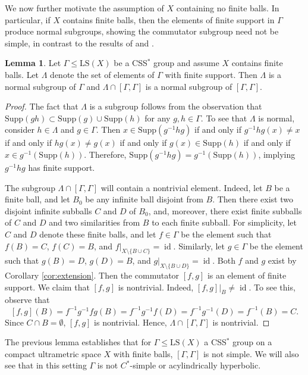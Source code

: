 \documentclass[12pt]{amsart}
\numberwithin{equation}{subsection}
\theoremstyle{definition}
\newtheorem{lemma}[theorem]{Lemma}
\theoremstyle{definition}
\theoremstyle{remark}
\newcommand{\supp}{\text{Supp}}
\begin{document}
We now further motivate the assumption of $X$ containing no finite balls. In particular, if $X$ contains finite balls, then the elements of finite support in $\Gamma$ produce normal subgroups, showing the commutator subgroup need not be simple, in contrast to the results of \cite{Matui20215SFT} and \cite{BleakEtAll2023}.


\begin{lemma}
    Let $\Gamma \leq \text{LS}(X)$ be a CSS$^*$ group and assume $X$ contains finite balls. Let $\Lambda$ denote the set of elements of $\Gamma$ with finite support. Then $\Lambda$ is a normal subgroup of $\Gamma$ and $\Lambda \cap [\Gamma,\Gamma]$ is a normal subgroup of $[\Gamma,\Gamma]$.
\end{lemma}

\begin{proof}
    The fact that $\Lambda$ is a subgroup follows from the observation that $\supp(gh) \subset \supp(g) \cup \supp(h)$ for any $g,h \in \Gamma$. To see that $\Lambda$ is normal, consider $h \in \Lambda$ and $g \in \Gamma$. Then $x \in \supp(g^{-1}hg)$ if and only if $g^{-1}hg(x)\neq x$ if and only if $hg(x) \neq g(x)$ if and only if $g(x) \in \supp(h)$ if and only if $x \in g^{-1}(\supp(h))$. Therefore, $\supp(g^{-1}hg) = g^{-1}(\supp(h))$, implying $g^{-1}hg$ has finite support.

    The subgroup $\Lambda \cap [\Gamma , \Gamma]$ will contain a nontrivial element. Indeed, let $B$ be a finite ball, and let $B_0$ be any infinite ball disjoint from $B$. Then there exist two disjoint infinite subballs $C$ and $D$ of $B_0$, and, moreover, there exist finite subballs of $C$ and $D$ and two similarities from $B$ to each finite subball. For simplicity, let $C$ and $D$ denote these finite balls, and let 
    $f \in \Gamma$ be the element such that $f(B) = C$, $f(C) = B$, and $f\vert_{X \setminus \{B \cup C\}} = \operatorname{id}$. Similarly, let $g \in \Gamma$ be the element such that $g(B) = D$, $g(D) = B$, and $g\vert_{X \setminus \{B \cup D\}} =\operatorname{id}.$ Both $f$ and $g$ exist by Corollary \ref{cor:extension}. Then the commutator $[f,g]$ is an element of finite support. We claim that $[f,g]$ is nontrivial. Indeed, $[f,g]\vert_B \neq \operatorname{id}$. To see this, observe that  
    $$[f,g](B) = f^{-1}g^{-1}fg(B) = f^{-1}g^{-1}f(D) = f^{-1}g^{-1}(D) = f^{-1}(B) = C.$$ Since $C \cap B = \emptyset$, $[f,g]$ is nontrivial. Hence, $\Lambda \cap [\Gamma , \Gamma ]$ is nontrivial. 
\end{proof}

The previous lemma establishes that for $\Gamma \le \text{LS}(X)$ a CSS$^*$ group on a compact ultrametric space $X$ with finite balls, $[\Gamma, \Gamma]$ is not simple. We will also see that in this setting $\Gamma$ is not $C^*$-simple or acylindrically hyperbolic. 
\end{document}
